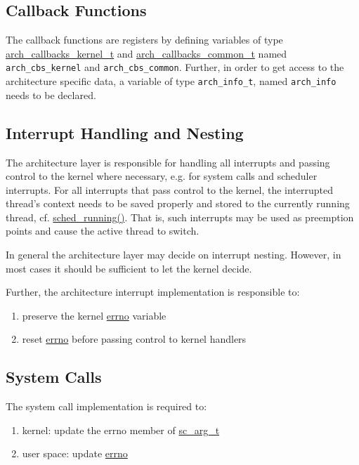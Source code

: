 	\subsection{Callback Functions}
		The callback functions are registers by defining variables of type \hyperref[structarch__callbacks__kernel__t]{arch\_callbacks\_kernel\_t} and \hyperref[structarch__callbacks__common__t]{arch\_callbacks\_common\_t} named \lstinline{arch_cbs_kernel} and \lstinline{arch_cbs_common}. Further, in order to get access to the architecture specific data, a variable of type \lstinline{arch_info_t}, named \lstinline{arch_info} needs to be declared.

	\subsection{Interrupt Handling and Nesting}
		The architecture layer is responsible for handling all interrupts and passing control to the kernel where necessary, e.g. for system calls and scheduler interrupts. For all interrupts that pass control to the kernel, the interrupted thread's context needs to be saved properly and stored to the currently running thread, cf. \hyperref[kernel_2sched_8c_a34a33397e7197f803feffb423ce6717a]{sched\_running()}. That is, such interrupts may be used as preemption points and cause the active thread to switch.

		In general the architecture layer may decide on interrupt nesting. However, in most cases it should be sufficient to let the kernel decide.

		Further, the architecture interrupt implementation is responsible to:
		\begin{enumerate}
			\item preserve the kernel \hyperref[errno_8h_ad65a8842cc674e3ddf69355898c0ecbf]{errno} variable
			\item reset \hyperref[errno_8h_ad65a8842cc674e3ddf69355898c0ecbf]{errno} before passing control to kernel handlers
		\end{enumerate}

	\subsection{System Calls}
		The system call implementation is required to:
		\begin{enumerate}
			\item kernel: update the errno member of \hyperref[sys_2syscall_8h_structsc__arg__t]{sc\_arg\_t}
			\item user space: update \hyperref[errno_8h_ad65a8842cc674e3ddf69355898c0ecbf]{errno}
		\end{enumerate}

